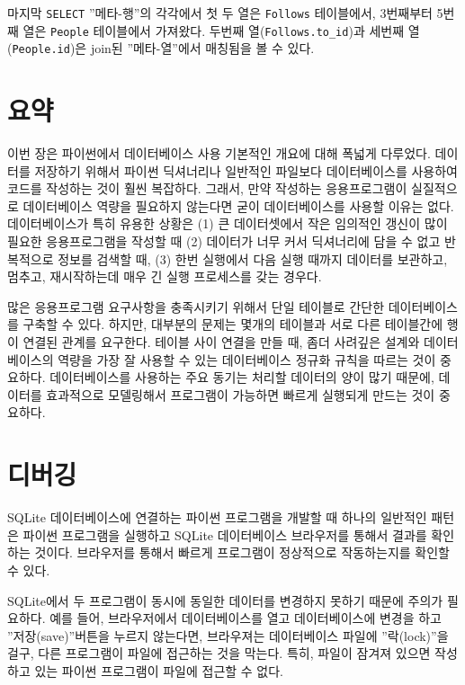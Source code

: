 마지막 {\tt SELECT} ''메타-행''의 각각에서 첫 두 열은 {\tt Follows} 테이블에서, 3번째부터 5번째 열은 {\tt People} 테이블에서 가져왔다. 
두번째 열(\verb"Follows.to_id")과 세번째 열({\tt People.id})은 join된 ''메타-열''에서 매칭됨을 볼 수 있다.

\section{요약}

이번 장은 파이썬에서 데이터베이스 사용 기본적인 개요에 대해 폭넓게 다루었다.
데이터를 저장하기 위해서 파이썬 딕셔너리나 일반적인 파일보다 데이터베이스를 사용하여 코드를 작성하는 것이 훨씬 복잡하다.
그래서, 만약 작성하는 응용프로그램이 실질적으로 데이터베이스 역량을 필요하지 않는다면 굳이 데이터베이스를 사용할 이유는 없다.
데이터베이스가 특히 유용한 상황은 
(1) 큰 데이터셋에서 작은 임의적인 갱신이 많이 필요한 응용프로그램을 작성할 때
(2) 데이터가 너무 커서 딕셔너리에 담을 수 없고 반복적으로 정보를 검색할 때, 
(3) 한번 실행에서 다음 실행 때까지 데이터를 보관하고, 멈추고, 재시작하는데 매우 긴 실행 프로세스를 갖는 경우다.

많은 응용프로그램 요구사항을 충족시키기 위해서 단일 테이블로 간단한 데이터베이스를 구축할 수 있다.
하지만, 대부분의 문제는 몇개의 테이블과 서로 다른 테이블간에 행이 연결된 관계를 요구한다.
테이블 사이 연결을 만들 때, 좀더 사려깊은 설계와 데이터베이스의 역량을 가장 잘 사용할 수 있는 데이터베이스 정규화 규칙을 따르는 것이 중요하다. 
데이터베이스를 사용하는 주요 동기는 처리할 데이터의 양이 많기 때문에, 
데이터를 효과적으로 모델링해서 프로그램이 가능하면 빠르게 실행되게 만드는 것이 중요하다.

\section{디버깅}

SQLite 데이터베이스에 연결하는 파이썬 프로그램을 개발할 때 하나의 일반적인 패턴은
파이썬 프로그램을 실행하고 SQLite 데이터베이스 브라우저를 통해서 결과를 확인하는 것이다.
브라우저를 통해서 빠르게 프로그램이 정상적으로 작동하는지를 확인할 수 있다.

SQLite에서 두 프로그램이 동시에 동일한 데이터를 변경하지 못하기 때문에 주의가 필요하다.
예를 들어, 브라우저에서 데이터베이스를 열고 데이터베이스에 변경을 하고 ''저장(save)''버튼을 누르지 않는다면,
브라우져는 데이터베이스 파일에 ''락(lock)''을 걸구, 다른 프로그램이 파일에 접근하는 것을 막는다.
특히, 파일이 잠겨져 있으면 작성하고 있는 파이썬 프로그램이 파일에 접근할 수 없다.

